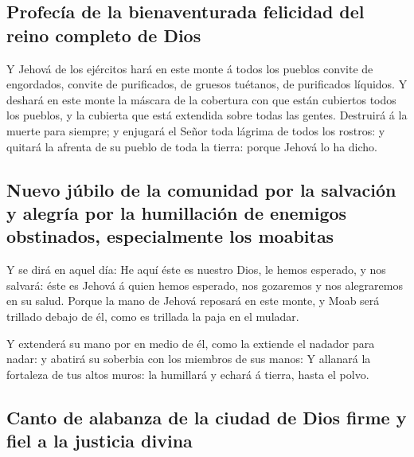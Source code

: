 \hypertarget{profecuxeda-de-la-bienaventurada-felicidad-del-reino-completo-de-dios}{%
\subsection{Profecía de la bienaventurada felicidad del reino completo
de
Dios}\label{profecuxeda-de-la-bienaventurada-felicidad-del-reino-completo-de-dios}}

 Y Jehová de los ejércitos hará en este monte á todos los
pueblos convite de engordados, convite de purificados, de gruesos
tuétanos, de purificados líquidos.  Y deshará en este monte
la máscara de la cobertura con que están cubiertos todos los pueblos, y
la cubierta que está extendida sobre todas las gentes. 
Destruirá á la muerte para siempre; y enjugará el Señor toda lágrima de
todos los rostros: y quitará la afrenta de su pueblo de toda la tierra:
porque Jehová lo ha dicho.

\hypertarget{nuevo-juxfabilo-de-la-comunidad-por-la-salvaciuxf3n-y-alegruxeda-por-la-humillaciuxf3n-de-enemigos-obstinados-especialmente-los-moabitas}{%
\subsection{Nuevo júbilo de la comunidad por la salvación y alegría por
la humillación de enemigos obstinados, especialmente los
moabitas}\label{nuevo-juxfabilo-de-la-comunidad-por-la-salvaciuxf3n-y-alegruxeda-por-la-humillaciuxf3n-de-enemigos-obstinados-especialmente-los-moabitas}}

 Y se dirá en aquel día: He aquí éste es nuestro Dios, le
hemos esperado, y nos salvará: éste es Jehová á quien hemos esperado,
nos gozaremos y nos alegraremos en su salud.  Porque la
mano de Jehová reposará en este monte, y Moab será trillado debajo de
él, como es trillada la paja en el muladar.

 Y extenderá su mano por en medio de él, como la extiende
el nadador para nadar: y abatirá su soberbia con los miembros de sus
manos:  Y allanará la fortaleza de tus altos muros: la
humillará y echará á tierra, hasta el polvo.

\hypertarget{canto-de-alabanza-de-la-ciudad-de-dios-firme-y-fiel-a-la-justicia-divina}{%
\subsection{Canto de alabanza de la ciudad de Dios firme y fiel a la
justicia
divina}\label{canto-de-alabanza-de-la-ciudad-de-dios-firme-y-fiel-a-la-justicia-divina}}

